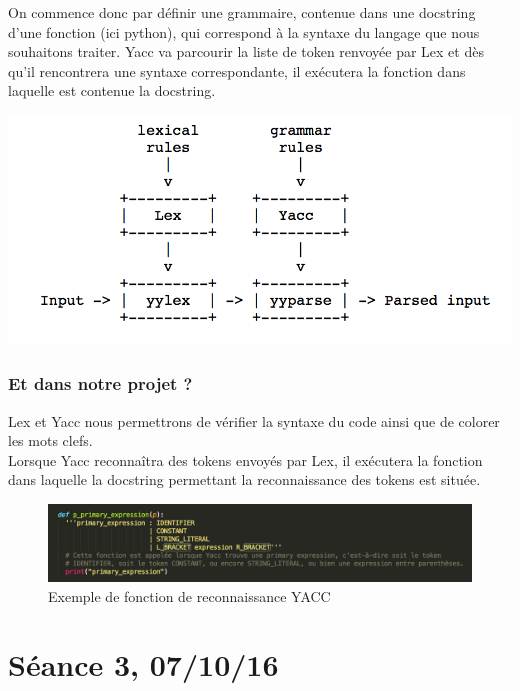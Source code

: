 \documentclass[a4paper,12pt]{article}
\begin{document}
			On commence donc par définir une grammaire, contenue dans une docstring d'une fonction (ici python), qui correspond à la syntaxe du langage que nous souhaitons traiter. Yacc va parcourir la liste de token renvoyée par Lex et dès qu'il rencontrera une syntaxe correspondante, il exécutera la fonction dans laquelle est contenue la docstring. 
			\vspace{0.5cm}
			\begin{center}
				\includegraphics[scale=0.6]{images/schema_lex_yacc.png}
			\end{center}

		\subsubsection{Et dans notre projet ?}

			Lex et Yacc nous permettrons de vérifier la syntaxe du code ainsi que de colorer les mots clefs. \\
			Lorsque Yacc reconnaîtra des tokens envoyés par Lex, il exécutera la fonction dans laquelle la docstring permettant la 			reconnaissance des tokens est située.
			
			\begin{figure}[!h]
			
				\begin{center}
					\includegraphics[scale=0.6]{images/exemple_fct_yacc.png}
					\caption{Exemple de fonction de reconnaissance YACC}
				\end{center}
			
			\end{figure}

\section{Séance 3, 07/10/16}
\end{document}
